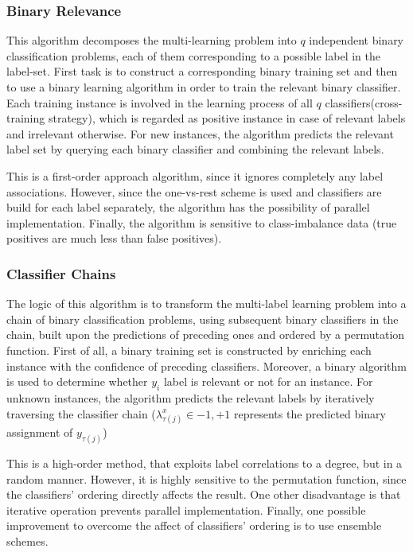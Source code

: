 \documentclass[12pt]{report}
\begin{document}
	\subsubsection*{Binary Relevance}
	This algorithm decomposes the multi-learning problem into $q$ independent binary classification problems, each of them corresponding to a possible label in the label-set. First task is to construct a corresponding binary training set and then to use a binary learning algorithm in order to train the relevant binary classifier. Each training instance is involved in the learning process of all $q$ classifiers(cross-training strategy), which is regarded as positive instance in case of relevant labels and irrelevant otherwise. For new instances, the algorithm predicts the relevant label set by querying each binary classifier and combining the relevant labels.
	
	This is a first-order approach algorithm, since it ignores completely any label associations. However, since the one-vs-rest scheme is used and classifiers are build for each label separately, the algorithm has the possibility of parallel implementation. Finally, the algorithm is sensitive to class-imbalance data (true positives are much less than false positives).
	
	\subsubsection*{Classifier Chains}
	The logic of this algorithm is to transform the multi-label learning problem into a chain of binary classification problems, using subsequent binary classifiers in the chain, built upon the predictions of preceding ones and ordered by a permutation function. First of all, a binary training set is constructed by enriching each instance with the confidence of preceding classifiers. Moreover, a binary algorithm is used to determine whether $y_i$ label is relevant or not for an instance. For unknown instances, the algorithm predicts the relevant labels by iteratively traversing the classifier chain ($\lambda _{\tau(j)}^x \in {-1, +1}$ represents the predicted binary assignment of $y_{\tau(j)}$)
	
	This is a high-order method, that exploits label correlations to a degree, but in a random manner. However, it is highly sensitive to the permutation function, since the classifiers' ordering directly affects the result. One other disadvantage is that iterative operation prevents parallel implementation. Finally, one possible improvement to overcome the affect of classifiers' ordering is to use ensemble schemes.
	
\end{document}
